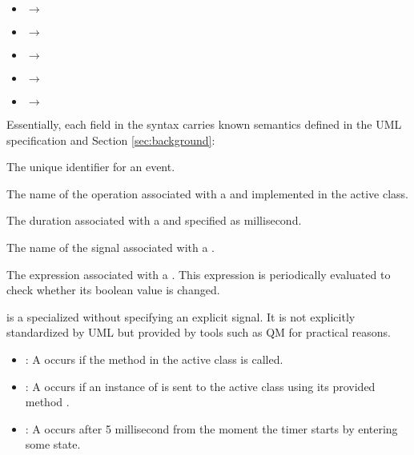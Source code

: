 \noindent
{}
\begin{itemize}[\footnotesize]
	\item {} $\rightarrow$  
	
	\item {} $\rightarrow$  
	
	\item {} $\rightarrow$  
	
	\item {} $\rightarrow$  
	
	\item {} $\rightarrow$  
\end{itemize}

\noindent
{}
Essentially, each field in the syntax carries known semantics defined in the UML specification and Section \ref{sec:background}:
\begin{description}[\footnotesize]
	\item[\ttt{name}] The unique identifier for an event.
	
	\item[\ttt{op}] The name of the operation associated with a  and implemented in the active class. 
	
	\item[\ttt{dur}] The duration associated with a  and specified as millisecond.
	
	\item[\ttt{sig}] The name of the signal associated with a .
	
	\item[\ttt{expr}] The expression associated with a . This expression is periodically evaluated to check whether its boolean value is changed.
\end{description}

 is a specialized  without specifying an explicit signal.
It is not explicitly standardized by UML but provided by tools such as QM \cite{qm} for practical reasons. 

\noindent
{}

\begin{itemize}[\footnotesize]
\item {}: A  occurs if the method  in the active class is called.

\item {}: A  occurs if an instance of  is sent to the active class using its provided method .

\item {}: A  occurs after 5 millisecond from the moment the timer starts by entering some state.
\end{itemize}

